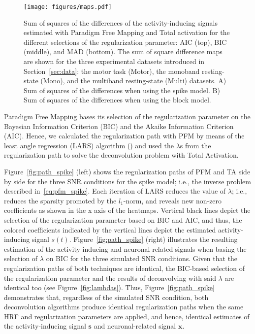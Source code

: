 \begin{figure}[t!]
    \begin{center}
        \texttt{[image: figures/maps.pdf]}
    \end{center}
    \caption{Sum of squares of the differences of the activity-inducing signals estimated with Paradigm Free Mapping and Total activation for the different selections of the regularization parameter: AIC (top), BIC (middle), and MAD (bottom). The sum of square difference maps are shown for the three experimental datasets introduced in Section~\ref{sec:data}: the motor task (Motor), the monoband resting-state (Mono), and the multiband resting-state (Multi) datasets. A) Sum of squares of the differences when using the spike model. B) Sum of squares of the differences when using the block model.}
\label{fig:rss}
\end{figure}


Paradigm Free Mapping bases its selection of the regularization parameter on the Bayesian Information Criterion (BIC) and the Akaike Information Criterion (AIC). Hence, we calculated the regularization path with PFM by means of the least angle regression (LARS) algorithm (\citealt{efron2004LeastAngleRegression}) and used the \(\lambda\)s from the regularization path to solve the deconvolution problem with Total Activation.

Figure~\ref{fig:path_spike} (left) shows the regularization paths of PFM and TA side by side for the three SNR conditions for the spike model; i.e., the inverse problem described in~\eqref{eq:pfm_spike}. Each iteration of LARS reduces the value of \(\lambda\); i.e., reduces the sparsity promoted by the \(l_1\)-norm, and reveals new non-zero coefficients as shown in the x axis of the heatmaps. Vertical black lines depict the selection of the regularization parameter based on BIC and AIC, and thus, the colored coefficients indicated by the vertical lines depict the estimated activity-inducing signal \(s(t)\). Figure~\ref{fig:path_spike} (right) illustrates the resulting estimation of the activity-inducing and neuronal-related signals when basing the selection of \(\lambda\) on BIC for the three simulated SNR conditions. Given that the regularization paths of both techniques are identical, the BIC-based selection of the regularization parameter and the results of deconvolving with said \(\lambda\) are identical too (see Figure~\ref{fig:lambdas}). Thus, Figure~\ref{fig:path_spike} demonstrates that, regardless of the simulated SNR condition, both deconvolution algorithms produce identical regularization paths when the same HRF and regularization parameters are applied, and hence, identical estimates of the activity-inducing signal \(\mathbf{s}\) and neuronal-related signal \(\mathbf{x}\).

